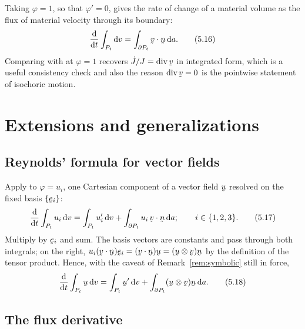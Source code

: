 Taking $\varphi=1$, so that $\varphi'=0$, gives the rate of change of a
material volume as the flux of material velocity through its boundary:
\begin{equation}
   \frac{\dl}{\dl t}\int_{P_{t}}\dl v=\int_{\partial P_{t}}\ip\bv\bn\,\dl a .
   \tag{5.16}\label{eq:5.16}
\end{equation}
Comparing with  at $\varphi=1$ recovers $\dot J/J=\dvg\bv$ in
integrated form, which is a useful consistency check and also the reason
$\dvg\bv=0$ is the pointwise statement of isochoric motion.

\section{Extensions and generalizations}\label{sec:extensions}

\subsection{Reynolds' formula for vector fields}\label{sec:reyvec}

Apply  to $\varphi=u_{i}$, one Cartesian component of a vector
field $\bu$ resolved on the fixed basis $\{\be_{i}\}$:
\begin{equation}
   \frac{\dl}{\dl t}\int_{P_{t}}u_{i}\,\dl v
   =\int_{P_{t}}u_{i}'\,\dl v
   +\int_{\partial P_{t}}u_{i}\,\ip\bv\bn\,\dl a ;
   \qquad i\in\{1,2,3\}.
   \tag{5.17}\label{eq:5.17}
\end{equation}
Multiply by $\be_{i}$ and sum. The basis vectors are constants and pass
through both integrals; on the right, $u_{i}(\ip\bv\bn)\be_{i}
=(\ip\bv\bn)\bu=(\bu\otimes\bv)\bn$ by the definition of the tensor
product. Hence, with the caveat of Remark~\ref{rem:symbolic} still in
force,
\begin{equation}
   \frac{\dl}{\dl t}\int_{P_{t}}\bu\,\dl v
   =\int_{P_{t}}\bu'\,\dl v
   +\int_{\partial P_{t}}(\bu\otimes\bv)\bn\,\dl a .
   \tag{5.18}\label{eq:5.18}
\end{equation}

\subsection{The flux derivative}\label{sec:fluxder}

